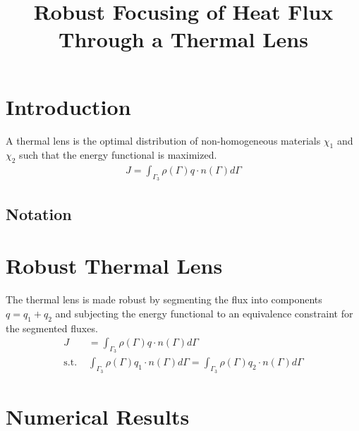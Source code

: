 \documentclass[11pt]{article}
\title{Robust Focusing of Heat Flux\\ Through a Thermal Lens}
\date{}
\begin{document}
\maketitle

\begin{abstract}
    
\end{abstract}

\section{Introduction}

A thermal lens is the optimal distribution of non-homogeneous materials $\chi_1$ and $\chi_2$ such that the energy functional is maximized.
\begin{align*}
	J = \int_{\Gamma_3}\rho(\Gamma)q\cdot n(\Gamma)d\Gamma
\end{align*}


\subsection{Notation}

\section{Robust Thermal Lens}

The thermal lens is made robust by segmenting the flux into components $q=q_1+q_2$ and subjecting the energy functional to an equivalence constraint for the segmented fluxes.
\begin{align*}
	J &= \int_{\Gamma_3}\rho(\Gamma)q\cdot n(\Gamma)d\Gamma \\
	\text{s.t. } & \int_{\Gamma_3}\rho(\Gamma)q_1\cdot n(\Gamma)d\Gamma = \int_{\Gamma_3}\rho(\Gamma)q_2\cdot n(\Gamma)d\Gamma 
\end{align*}


\section{Numerical Results}

\newpage


\end{document}
